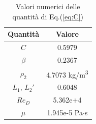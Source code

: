 \begin{table}
	\centering
	\begin{tabular}{c|c}
		\toprule
		\toprule
		\textbf{Quantità} & \textbf{Valore}\\
		\midrule
		\midrule
		$C$ & 0.5979\\
		\midrule
		$\beta$ & 0.2367\\
		\midrule
		$\rho_2$ & 4.7073 kg/m\textsuperscript{3}\\
		\midrule
		$L_1,\,L_2'$ & 0.6048\\
		\midrule
		$Re_D$ & 5.362e+4\\
		\midrule
		$\mu$ & 1.945e-5 Pa$\cdot$s\\
	\end{tabular}
\caption{Valori numerici delle quantità di Eq.(\ref{eq:C})}
\label{tab:valoriC}
\end{table}